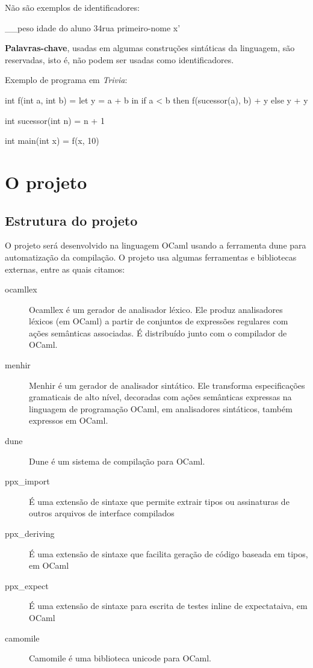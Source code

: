 \documentclass[a4paper,11pt,brazil]{article}
\newcommand{\lang}{\textsl{Trivia}}
\begin{document}
Não são exemplos de identificadores:
\begin{pygmented}[lang=text]
__peso
idade do aluno
34rua
primeiro-nome
x'
\end{pygmented}

\textbf{Palavras-chave}, usadas em algumas construções sintáticas da
linguagem, são reservadas, isto é, não podem ser usadas como
identificadores.

Exemplo de programa em \lang{}:
\begin{pygmented}[lang=text]
int f(int a, int b) =
  let y = a + b
  in
    if a < b then
      f(sucessor(a), b) + y
    else
      y + y

int sucessor(int n) =
  n + 1

int main(int x) =
  f(x, 10)
\end{pygmented}

\section{O projeto}

\subsection{Estrutura do projeto}

O projeto será desenvolvido na linguagem OCaml usando a ferramenta
dune para automatização da compilação. O projeto usa algumas
ferramentas e bibliotecas externas, entre as quais citamos:
\begin{description}
  \item[ocamllex] Ocamllex é um gerador de analisador léxico. Ele
  produz analisadores léxicos (em OCaml) a partir de conjuntos de
  expressões regulares com ações semânticas associadas. É distribuído
  junto com o compilador de OCaml.
  
  \item[menhir] Menhir é um gerador de analisador sintático. Ele
  transforma especificações gramaticais de alto nível, decoradas com
  ações semânticas expressas na linguagem de programação OCaml, em
  analisadores sintáticos, também expressos em OCaml.

  \item[dune] Dune é um sistema de compilação para OCaml.

  \item[ppx_import] É uma extensão de sintaxe que permite extrair
  tipos ou assinaturas de outros arquivos de interface compilados

  \item[ppx_deriving] É uma extensão de sintaxe que facilita geração
  de código baseada em tipos, em OCaml

  \item[ppx_expect] É uma extensão de sintaxe para escrita de testes
  inline de expectataiva, em OCaml

  \item[camomile] Camomile é uma biblioteca unicode para OCaml.  
\end{description}
  
\end{document}
